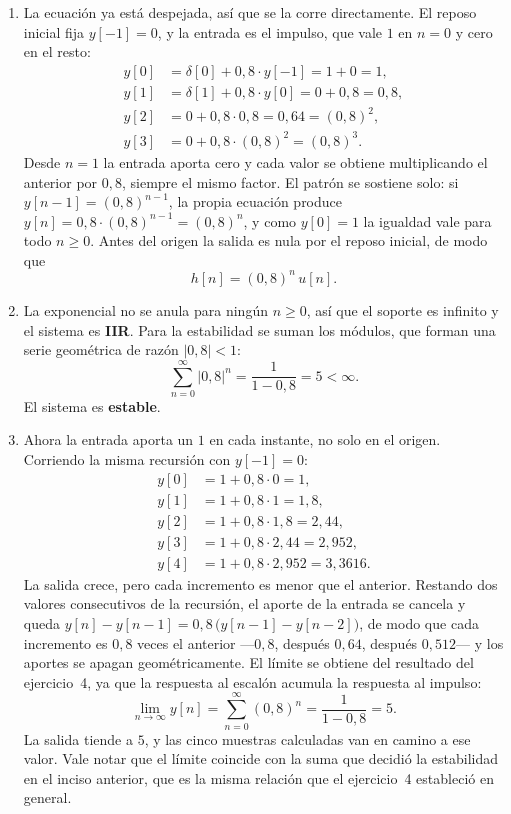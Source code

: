 \documentclass[10pt,a4paper]{article}
\begin{document}
	\begin{enumerate}
		\item La ecuación ya está despejada, así que se la
		corre directamente. El reposo inicial fija $y[-1]=0$, y la entrada es el impulso, que
		vale $1$ en $n=0$ y cero en el resto:
		\[
			\begin{aligned}
			y[0] &= \delta[0] + 0{,}8\cdot y[-1] = 1 + 0 = 1, \\
			y[1] &= \delta[1] + 0{,}8\cdot y[0]  = 0 + 0{,}8 = 0{,}8, \\
			y[2] &= 0 + 0{,}8\cdot 0{,}8 = 0{,}64 = (0{,}8)^2, \\
			y[3] &= 0 + 0{,}8\cdot (0{,}8)^2 = (0{,}8)^3.
			\end{aligned}
		\]
		Desde $n=1$ la entrada aporta cero y cada valor se obtiene multiplicando el anterior
		por $0{,}8$, siempre el mismo factor. El patrón se sostiene solo: si $y[n-1]=(0{,}8)^{n-1}$,
		la propia ecuación produce $y[n]=0{,}8\cdot(0{,}8)^{n-1}=(0{,}8)^n$, y como $y[0]=1$
		la igualdad vale para todo $n\ge 0$. Antes del origen la salida es nula por el reposo
		inicial, de modo que
		\[
			\boxed{\;h[n] = (0{,}8)^{n}\,u[n].\;}
		\]

		\item La exponencial no se anula para ningún
		$n \ge 0$, así que el soporte es infinito y el sistema es \textbf{IIR}. Para la
		estabilidad se suman los módulos, que forman una serie geométrica de razón
		$|0{,}8|<1$:
		\[
			\sum_{n=0}^{\infty} |0{,}8|^{n} = \frac{1}{1-0{,}8} = 5 < \infty.
		\]
		El sistema es \textbf{estable}.

		\item Ahora la entrada aporta un $1$ en cada
		instante, no solo en el origen. Corriendo la misma recursión con $y[-1]=0$:
		\[
			\begin{aligned}
			y[0] &= 1 + 0{,}8\cdot 0        = 1, \\
			y[1] &= 1 + 0{,}8\cdot 1        = 1{,}8, \\
			y[2] &= 1 + 0{,}8\cdot 1{,}8    = 2{,}44, \\
			y[3] &= 1 + 0{,}8\cdot 2{,}44   = 2{,}952, \\
			y[4] &= 1 + 0{,}8\cdot 2{,}952  = 3{,}3616.
			\end{aligned}
		\]
		La salida crece, pero cada incremento es menor que el anterior. Restando dos
		valores consecutivos de la recursión, el aporte de la entrada se cancela y queda
		$y[n]-y[n-1] = 0{,}8\,\bigl(y[n-1]-y[n-2]\bigr)$, de modo que cada incremento es
		$0{,}8$ veces el anterior ---$0{,}8$, después $0{,}64$, después $0{,}512$--- y los
		aportes se apagan geométricamente. El límite se obtiene del resultado del
		ejercicio~4, ya que la respuesta al escalón acumula la respuesta al impulso:
		\[
			\lim_{n\to\infty} y[n] = \sum_{n=0}^{\infty} (0{,}8)^{n} = \frac{1}{1-0{,}8} = 5.
		\]
		La salida tiende a $\boxed{5}$, y las cinco muestras calculadas van en camino a ese
		valor. Vale notar que el límite coincide con la suma que decidió la estabilidad en el
		inciso anterior, que es la misma relación que el ejercicio~4 estableció en general.


\end{enumerate}
\end{document}
